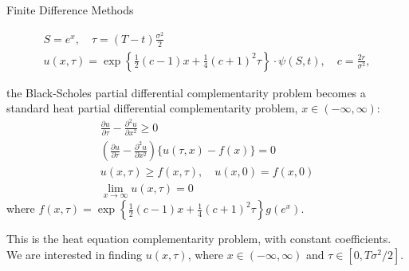 \documentclass{beamer}
\begin{document}
\begin{frame}{Finite Difference Methods}

    {\footnotesize \footnotesize
    \vspace{-2em}
    \begin{gather*}
        S = e^x, \quad \tau = (T - t) \frac{\sigma^2}{2}\\
        u(x,\tau) = \exp\left\{ \frac{1}{2} (c - 1)x +
         \frac{1}{4} (c + 1)^2 \tau \right\} \cdot \psi(S,t), \quad c = \frac{2r}{\sigma^2},
    \end{gather*}
    
        the Black-Scholes partial differential complementarity problem becomes 
        a standard heat partial differential complementarity problem, $x \in (-\infty, \infty)$:
        \begin{gather*}
            \frac{\partial u}{\partial \tau} - \frac{\partial^2 u}{\partial x^2} \geq 0\\
            \left( \frac{\partial u}{\partial \tau} - \frac{\partial^2 u}{\partial x^2} \right) \{u(\tau, x) - f(x)\} = 0\\
            u(x, \tau) \geq f(x, \tau), \quad u(x, 0) = f(x, 0) \\
            \lim_{x \to \infty} u(x, \tau) = 0
        \end{gather*}
        where $f(x, \tau) = \exp \left\{ \frac{1}{2} (c-1)x + \frac{1}{4} (c+1)^2 \tau \right\} g(e^x)$.
        
        This is the heat equation complementarity problem, with constant coefficients. 
        We are interested in finding $u(x, \tau)$, where
        $x \in (-\infty, \infty)$ and $\tau \in [0, T\sigma^2/2]$.
        }
    
\end{frame}
\end{document}
